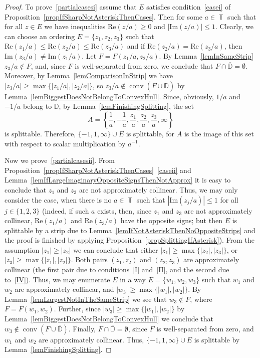 \documentclass{amsart}
\numberwithin{equation}{section}
\theoremstyle{definition}
\theoremstyle{remark}
\DeclareMathOperator{\conv}{conv}
\DeclareMathOperator{\TT}{\mathbb T}
\begin{document}
	\begin{proof}
		To prove~\ref{partialcasesi} assume that $E$ satisfies condition~\ref{casei} of Proposition~\ref{propIfSharpNotAsteriskThenCases}. Then for some $a \in \TT$ such that for all $z \in E$ we have inequalities $\mathrm{Re}(z/a) \ge 0$ and $|\mathrm{Im}(z/a)| \le 1$. Clearly, we can choose an ordering $E = \{z_1, z_2, z_3\}$ such that $\mathrm{Re}(z_1/a) \le \mathrm{Re}(z_2/a) \le \mathrm{Re}(z_3/a)$ and if $\mathrm{Re}(z_2/a) = \mathrm{Re}(z_3/a)$, then $\mathrm{Im}(z_3/a) \ne \mathrm{Im}(z_1/a)$. Let $F = F(z_1/a, z_2/a)$. By Lemma~\ref{lemInSameStrip} $z_3/a \notin F$, and, since $F$ is well-separated from zero, we conclude that $F \cap \overline{\mathbb D} = \emptyset$. Moreover, by Lemma~\ref{lemComparisonInStrip} we have $|z_3/a| \ge \max\{|z_1/a|, |z_2/a|\}$, so $z_3/a \notin \conv(F \cup \overline{\mathbb D})$ by Lemma~\ref{lemBiggestDoesNotBelongToConvexHull}. Since, obviously, $1/a$ and $-1/a$ belong to $\overline{\mathbb D}$, by Lemma~\ref{lemFinishingSplitting}, the set
		\[
		A = \left\{\dfrac{1}{a}, -\dfrac{1}{a}, \dfrac{z_1}{a}, \dfrac{z_2}{a}, \dfrac{z_3}{a}, \infty\right\}
		\]
		is splittable. Therefore, $\{-1, 1, \infty\} \cup E$ is splittable, for $A$ is the image of this set with respect to scalar multiplication by $a^{-1}$.
		
		Now we prove~\ref{partialcasesii}. From Proposition~\ref{propIfSharpNotAsteriskThenCases}~\ref{caseii} and Lemma~\ref{lemIfLargeImaginaryOppositeSignsThenNotApprox} it is easy to conclude that  $z_1$ and $z_3$ are not approximately collinear. Thus, we may only consider the case, when there is no $a \in \TT$ such that $|\mathrm{Im}(z_j/a)| \le 1$ for all $j \in \{1,2,3\}$ (indeed, if such $a$ exists, then, since $z_1$ and $z_3$ are not approximately collinear, $\mathrm{Re}(z_1/a)$ and $\mathrm{Re}(z_3/a)$ have the opposite signs; but then $E$ is splittable by a strip due to Lemma~\ref{lemIfNotAsteriskThenNoOppositeStrips} and the proof is finished by applying Proposition~\ref{propSplittingIfAsterisk}). From the assumption $|z_1| \ge |z_2|$ we can conclude that either $|z_1| \ge \max \{|z_2|, |z_3|\}$, or $|z_3| \ge \max \{|z_1|, |z_2|\}$. Both pairs $(z_1, z_2)$ and $(z_2, z_3)$ are approximately collinear (the first pair due to conditions~\ref{I} and~\ref{II}, and the second due to~\ref{IV}). Thus, we may enumerate $E$ in a way $E = \{w_1, w_2, w_3\}$ such that $w_1$ and $w_2$ are approximately collinear, and $ |w_3| \ge \max\{|w_1|, |w_2|\}$. By Lemma~\ref{lemLargestNotInTheSameStrip} we see that $w_3 \notin F$, where $F = F(w_1, w_2)$. Further, since $ |w_3| \ge \max\{|w_1|, |w_2|\}$ by Lemma~\ref{lemBiggestDoesNotBelongToConvexHull} we conclude that $w_3 \notin \conv(F \cup \overline{\mathbb D})$. Finally, $F \cap \overline{\mathbb D} = \emptyset$, since $F$ is well-separated from zero, and $w_1$ and $w_2$ are approximately collinear. Thus, $\{-1,1,\infty\} \cup E$ is splittable by Lemma~\ref{lemFinishingSplitting}.
	\end{proof}
	
\end{document}
